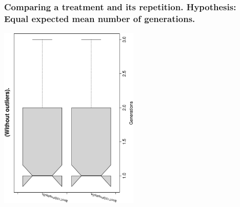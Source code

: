  \begin{frame}
 \frametitle{ Comparing a treatment and its repetition. Hypothesis: Equal expected mean number of generations. }
 \begin{center}
\includegraphics[width=0.5\textwidth, angle=-90]
{ExpCboxplottGenerations003.eps}
 \end{center}
 \label{ExpCboxplottGenerations003.eps}  
 \end{frame}

